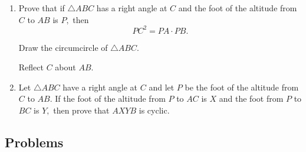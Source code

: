 \begin{enumerate}
\item Prove that if $\triangle ABC$ has a right angle at $C$ and the foot of the altitude from $C$ to $AB$ is $P,$ then
\[PC^2=PA\cdot PB.\]
\begin{hint}
\begin{addhint}
{Draw the circumcircle of $\triangle ABC.$}
\end{addhint}
\begin{addhint}
{Reflect $C$ about $AB.$}
\end{addhint}
\end{hint}

\item Let $\triangle ABC$ have a right angle at $C$ and let $P$ be the foot of the altitude from $C$ to $AB.$ If the foot of the altitude from $P$ to $AC$ is $X$ and the foot from $P$ to $BC$ is $Y,$ then prove that $AXYB$ is cyclic.
\end{enumerate}

\subsection{Problems}

